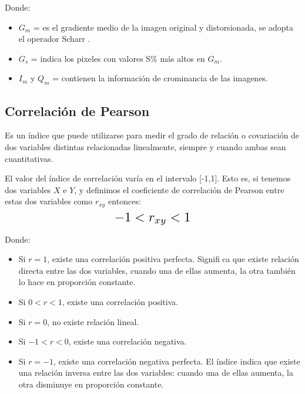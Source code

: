 \documentclass[spanish,twocolumn]{article}
\begin{document}
Donde:
\begin{itemize}
 \item $G_{m}$ =  es el gradiente medio de la imagen original y distorsionada, se adopta el operador Scharr  \cite{gradiente}.
 \item $ G_{s}$ = indica los pixeles con valores S\% más altos en $G_{m}$.
 \item  $I_{m}$ y $Q_{m}$ = contienen la información de crominancia de las imagenes. 
\end{itemize} 

\subsection{Correlación de Pearson}
\label{ssec:correlacion}
Es un índice que puede utilizarse para medir el grado de relación o covariación de dos variables distintas relacionadas linealmente,  siempre y cuando ambas sean cuantitativas.

El valor del  índice de correlación varía en el intervalo [-1,1]. Esto es, si tenemos dos variables $X$ e $Y$, y definimos el coeficiente de correlación de Pearson entre estas dos variables como $r_{xy}$ entonces: 
\begin{equation}\label{eq:gm}
\resizebox{.3\hsize}{!}
{
$-1<r_{xy}<1$ 
}
\end{equation}

Donde:
\begin{itemize}
\item Si $r = 1$, existe una correlación positiva perfecta. Significa que existe relación directa entre las dos variables, cuando una de ellas aumenta, la otra también lo hace en proporción constante.
\item Si $0<r<1$, existe una correlación positiva.
\item Si $r = 0$, no existe relación lineal.
\item Si $-1<r<0$, existe una correlación negativa.
\item Si $r = -1$, existe una correlación negativa perfecta. El índice indica que existe una relación inversa entre las dos variables: cuando una de ellas aumenta, la otra disminuye en proporción constante.
\end{itemize}
\end{document}
